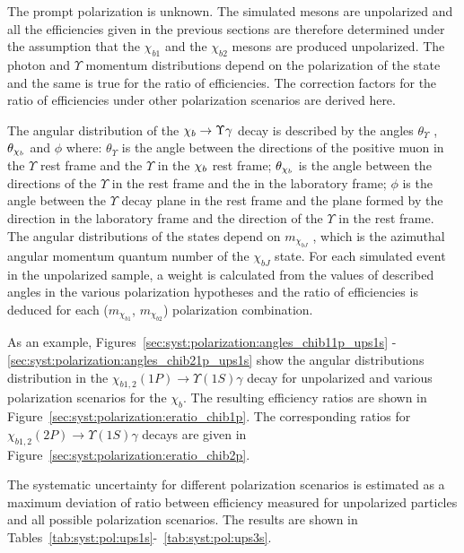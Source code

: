 The prompt \chib polarization is unknown. The simulated \chib mesons are
unpolarized and all the efficiencies given in the previous sections are
therefore determined under the assumption that the $\chi_{b1}$ and the
$\chi_{b2}$ mesons are produced unpolarized. The photon and $\Upsilon$ momentum
distributions depend on the polarization of the \chib state and the same is
true for the ratio of efficiencies. The correction factors for the ratio of
efficiencies under other polarization scenarios are derived here.

The angular distribution of the $\chi_{b} \rightarrow \Upsilon \gamma$ decay is described
by the angles $\theta_{\Upsilon}$ , $\theta_{\chi_{b}}$ and $\phi$ where:
$\theta_{\Upsilon}$ is the angle between the directions of the positive muon in
the $\Upsilon$ rest frame and the $\Upsilon$ in the $\chi_{b}$ rest frame;
$\theta_{\chi_{b}}$ is the angle between the directions of the $\Upsilon$ in the
\chib rest frame and the \chib in the laboratory frame; $\phi$ is the angle
between the $\Upsilon$ decay plane in the \chib rest frame and the plane formed
by the \chib direction in the laboratory frame and the direction of the
$\Upsilon$ in the \chib rest frame. The angular distributions of the
\chib states depend on $m_{\chi_{bJ}}$ , which is the azimuthal angular
momentum quantum number of the $\chi_{bJ}$ state. For each simulated event in
the unpolarized sample, a weight is calculated from the values of described
angles in the various polarization hypotheses and the ratio of efficiencies is
deduced for each ($m_{\chi_{b1}}$, $m_{\chi_{b2}}$) polarization combination.

As an example, Figures~\ref{sec:syst:polarization:angles_chib11p_ups1s}
-\ref{sec:syst:polarization:angles_chib21p_ups1s} show the angular
distributions distribution in the $\chi_{b1,2}(1P) \to \Upsilon(1S) \gamma$
decay for unpolarized and various polarization scenarios for the $\chi_b$. The
resulting efficiency ratios are shown in
Figure~\ref{sec:syst:polarization:eratio_chib1p}. The corresponding ratios for
$\chi_{b1,2}(2P) \to \Upsilon(1S) \gamma$ decays are given in
Figure~\ref{sec:syst:polarization:eratio_chib2p}.






The systematic uncertainty for different polarization scenarios is estimated
as a maximum deviation of ratio between efficiency measured for unpolarized
particles and all possible polarization scenarios. The results  are
shown in Tables~\ref{tab:syst:pol:ups1s}-~\ref{tab:syst:pol:ups3s}.

